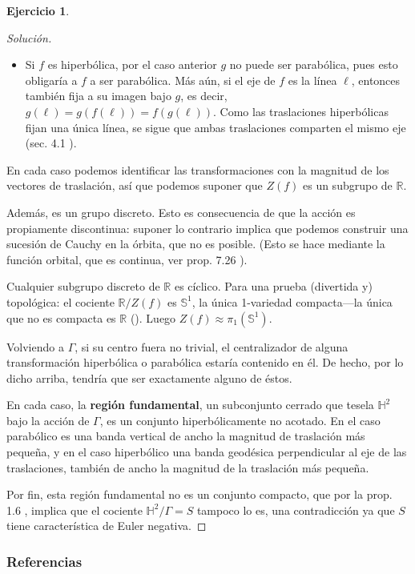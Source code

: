\documentclass[spanish]{article}
\theoremstyle{definition}
\newtheorem*{ejer*}{Ejercicio}
\newcommand{\R}{\mathbb{R}}
\newcommand{\Sp}{\mathbb{S}}
\newcommand{\Hy}{\mathbb{H}}
\begin{document}
\begin{ejer*}
\begin{proof}[Solución]
\begin{itemize}
				Conjugando con la transformación adecuada, podemos suponer que $x=\infty$, lo que obliga a las transformaciones en el centralizador $Z(f)$ de $f$ a ser traslaciones horizontales euclideanas $z\mapsto z+\lambda$, con $\lambda\in\R$.
			
				\item Si $f$ es hiperbólica, por el caso anterior $g$ no puede ser parabólica, pues esto obligaría a $f$ a ser parabólica. Más aún, si el eje de $f$ es la línea $\ell$, entonces también fija a su imagen bajo $g$, es decir, $g(\ell)=g(f(\ell))=f(g(\ell))$. Como las traslaciones hiperbólicas fijan una única línea, se sigue que ambas traslaciones comparten el mismo eje (sec. 4.1 \cite{Vinberg-1}).
			\end{itemize}
			En cada caso podemos identificar las transformaciones con la magnitud de los vectores de traslación, así que podemos suponer que $Z(f)$ es un subgrupo de $\R$.
			
			Además, es un grupo discreto. Esto es consecuencia de que la acción es propiamente discontinua: suponer lo contrario implica que podemos construir una sucesión de Cauchy en la órbita, que no es posible. (Esto se hace mediante la función orbital, que es continua, ver prop. 7.26 \cite{Lee}).
			
			Cualquier subgrupo discreto de $\R$ es cíclico. Para una prueba (divertida y) topológica: el cociente $\R/Z(f)$ es $\Sp^1$, la única 1-variedad compacta---la única que no es compacta es $\R$ (\cite{Milnor}). Luego $Z(f)\approx\pi_1(\Sp^1)$.
			
			Volviendo a $\Gamma$, si su centro fuera no trivial, el centralizador de alguna transformación hiperbólica o parabólica estaría contenido en él. De hecho, por lo dicho arriba, tendría que ser exactamente alguno de éstos.
			
			En cada caso, la \textbf{región fundamental}, un subconjunto cerrado que tesela $\Hy^2$ bajo la acción de $\Gamma$, es un conjunto hiperbólicamente no acotado. En el caso parabólico es una banda vertical de ancho la magnitud de traslación más pequeña, y en el caso hiperbólico una banda geodésica perpendicular al eje de las traslaciones, también de ancho la magnitud de la traslación más pequeña.
			
			Por fin, esta región fundamental no es un conjunto compacto, que por la prop. 1.6 \cite{Vinberg-2}, implica que el cociente $\Hy^2/\Gamma=S$ tampoco lo es, una contradicción ya que $S$ tiene característica de Euler negativa.
		\end{proof}
	\end{ejer*}
	\subsubsection*{Referencias}
	\printbibliography[heading=none]
	
\end{document}
